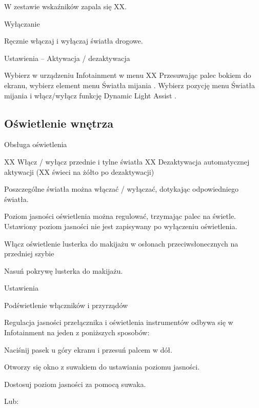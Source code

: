 W zestawie wskaźników zapala się XX.

Wyłączanie

\begin{itemizeArrow}
	\itemArrow Ręcznie włączaj i wyłączaj światła drogowe.
\end{itemizeArrow}

Ustawienia -- Aktywacja / dezaktywacja

\begin{itemizeArrow}
	\itemArrow Wybierz w urządzeniu Infotainment w menu XX
	\itemArrow Przesuwając palec bokiem do ekranu, wybierz element menu Światła mijania .
	\itemArrow Wybierz pozycję menu Światła mijania i włącz/wyłącz funkcję Dynamic Light Assist .
\end{itemizeArrow}


\subsection{Oświetlenie wnętrza}

Obsługa oświetlenia

XX Włącz / wyłącz przednie i tylne światła
XX Dezaktywacja automatycznej aktywacji
(XX świeci na żółto po dezaktywacji)

Poszczególne światła można włączać / wyłączać, dotykając odpowiedniego światła.

Poziom jasności oświetlenia można regulować, trzymając palec na świetle. Ustawiony poziom jasności nie jest zapisywany po wyłączeniu oświetlenia.

Włącz oświetlenie lusterka do makijażu w osłonach przeciwsłonecznych na przedniej szybie
\begin{itemizeArrow}
	\itemArrow Nasuń pokrywę lusterka do makijażu.
\end{itemizeArrow}


Ustawienia

Podświetlenie włączników i przyrządów

Regulacja jasności przełącznika i oświetlenia instrumentów odbywa się w Infotainment na jeden z poniższych sposobów:
\begin{itemizeArrow}
	\itemArrow Naciśnij pasek u góry ekranu i przesuń palcem w dół.
\end{itemizeArrow}
Otworzy się okno z suwakiem do ustawiania poziomu jasności.
\begin{itemizeArrow}
	\itemArrow Dostosuj poziom jasności za pomocą suwaka.
\end{itemizeArrow}

Lub:

